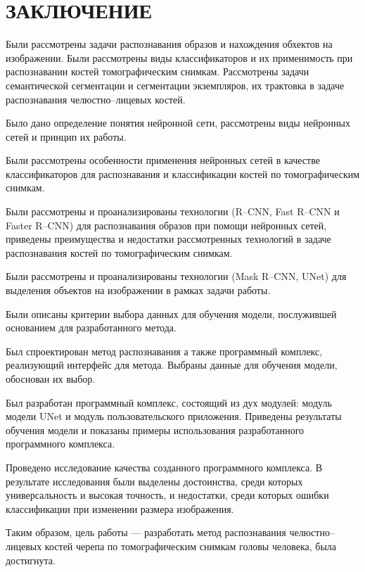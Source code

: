 \section*{ЗАКЛЮЧЕНИЕ}

Были рассмотрены задачи распознавания образов и нахождения обхектов на изображении. Были рассмотрены виды классификаторов и их применимость при распознавании костей томографическим снимкам. Рассмотрены задачи семантической сегментации и сегментации экземпляров, их трактовка в задаче распознавания челюстно--лицевых костей.

Было дано определение понятия нейронной сети, рассмотрены виды нейронных сетей и принцип их работы.

Были рассмотрены особенности применения нейронных сетей в качестве классификаторов для распознавания и классификации костей по томографическим снимкам.

Были рассмотрены и проанализированы технологии (R--CNN, Fast R--CNN и Faster R--CNN) для распознавания образов при помощи нейронных сетей, приведены преимущества и недостатки рассмотренных технологий в задаче распознавания костей по томографическим снимкам.

Были рассмотрены и проанализированы технологии (Mask R--CNN, UNet) для выделения объектов на изображении в рамках задачи работы.

Были описаны критерии выбора данных для обучения модели, послужившей основанием для разработанного метода.

Был спроектирован метод распознавания а также программный комплекс, реализующий интерфейс для метода. Выбраны данные для обучения модели, обоснован их выбор.

Был разработан программный комплекс, состоящий из дух модулей: модуль модели UNet и модуль пользовательского приложения. Приведены результаты обучения модели и показаны примеры использования разработанного программного комплекса.

Проведено исследование качества созданного программного комплекса. В результате исследования были выделены достоинства, среди которых универсальность и высокая точность, и недостатки, среди которых ошибки классификации при изменении размера изображения.

Таким образом, цель работы --- разработать метод распознавания челюстно--лицевых костей черепа по томографическим снимкам головы человека, была достигнута.